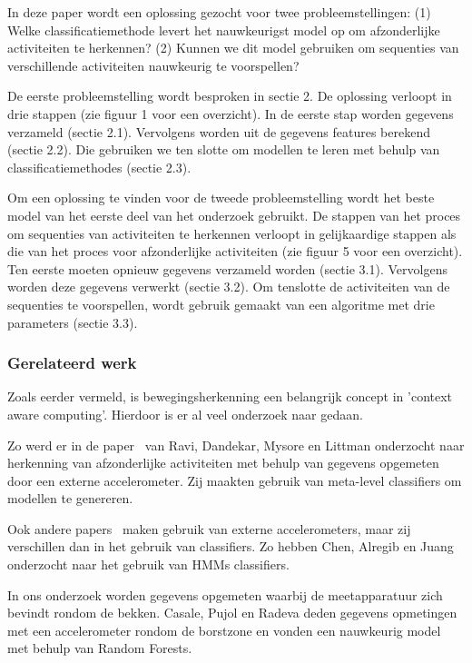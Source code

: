 \documentclass{article}
\begin{document}
In deze paper wordt een oplossing gezocht voor twee probleemstellingen: (1) Welke classificatiemethode levert het nauwkeurigst model op om afzonderlijke activiteiten te herkennen? (2) Kunnen we dit model gebruiken om sequenties van verschillende activiteiten nauwkeurig te voorspellen?

De eerste probleemstelling wordt besproken in sectie 2. De oplossing verloopt in drie stappen (zie figuur 1 voor een overzicht). In de eerste stap worden gegevens verzameld (sectie 2.1). Vervolgens worden uit de gegevens features berekend (sectie 2.2). Die gebruiken we ten slotte om modellen te leren met behulp van classificatiemethodes (sectie 2.3).

Om een oplossing te vinden voor de tweede probleemstelling wordt het beste model van het eerste deel van het onderzoek gebruikt. De stappen van het proces om sequenties van activiteiten te herkennen verloopt in gelijkaardige stappen als die van het proces voor afzonderlijke activiteiten (zie figuur 5 voor een overzicht). Ten eerste moeten opnieuw gegevens verzameld worden (sectie 3.1). Vervolgens worden deze gegevens verwerkt (sectie 3.2). Om tenslotte de activiteiten van de sequenties te voorspellen, wordt gebruik gemaakt van een algoritme met drie parameters (sectie 3.3).

\subsubsection{Gerelateerd werk}

Zoals eerder vermeld, is bewegingsherkenning een belangrijk concept in 'context aware computing'. Hierdoor is er al veel onderzoek naar gedaan.

Zo werd er in de paper~\cite{Ravi and others:act.recogn.} van Ravi, Dandekar, Mysore en Littman onderzocht naar herkenning van afzonderlijke activiteiten met behulp van gegevens opgemeten door een externe accelerometer. Zij maakten gebruik van meta-level classifiers om modellen te genereren.

Ook andere papers~\cite{6dmotion} maken gebruik van externe accelerometers, maar zij verschillen dan in het gebruik van classifiers. Zo hebben Chen, Alregib en Juang onderzocht naar het gebruik van HMMs classifiers.

In ons onderzoek worden gegevens opgemeten waarbij de meetapparatuur zich bevindt rondom de bekken. Casale, Pujol en Radeva deden gegevens opmetingen met een accelerometer rondom de borstzone en vonden een nauwkeurig model met behulp van Random Forests.~\cite{act.rec.}
\end{document}
